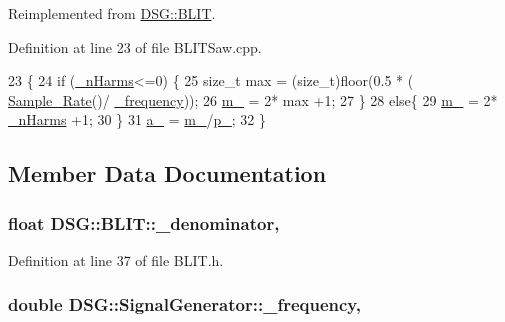 Reimplemented from \hyperlink{classDSG_1_1BLIT_ac59980dee201683229d5a106f941298b}{D\+S\+G\+::\+B\+L\+I\+T}.



Definition at line 23 of file B\+L\+I\+T\+Saw.\+cpp.


\begin{DoxyCode}
23                             \{
24     \textcolor{keywordflow}{if} (\hyperlink{classDSG_1_1BLIT_afe749d26f1503740bedd54f5147bc66d}{\_nHarms}<=0) \{
25         \textcolor{keywordtype}{size\_t} max = (size\_t)floor(0.5 * ( \hyperlink{namespaceDSG_a0c5c3a251b3688398da18138c5efe4bf}{Sample\_Rate}()/ \hyperlink{classDSG_1_1SignalGenerator_a67e296e3506dcdf09402c667cddff9ac}{\_frequency}));
26         \hyperlink{classDSG_1_1BLIT_a93504a847d83314bbd9020750820242b}{m\_} = 2* max +1;
27     \}
28     \textcolor{keywordflow}{else}\{
29         \hyperlink{classDSG_1_1BLIT_a93504a847d83314bbd9020750820242b}{m\_} = 2* \hyperlink{classDSG_1_1BLIT_afe749d26f1503740bedd54f5147bc66d}{\_nHarms} +1;
30     \}
31     \hyperlink{classDSG_1_1BLITSaw_a71b040fae6e1d67b56c580db9f4e5c3a}{a\_} = \hyperlink{classDSG_1_1BLIT_a93504a847d83314bbd9020750820242b}{m\_}/\hyperlink{classDSG_1_1BLITSaw_addcb3fc898bb08c71cfe81e12e2891b9}{p\_};
32 \}\end{DoxyCode}


\subsection{Member Data Documentation}
\hypertarget{classDSG_1_1BLIT_a664b4f06a7b5657261cfaa30dd503c16}{
\subsubsection[{\+\_\+denominator}]{\setlength{\rightskip}{0pt plus 5cm}float D\+S\+G\+::\+B\+L\+I\+T\+::\+\_\+denominator\hspace{0.3cm}{\ttfamily [protected]}, {\ttfamily [inherited]}}}\label{classDSG_1_1BLIT_a664b4f06a7b5657261cfaa30dd503c16}


Definition at line 37 of file B\+L\+I\+T.\+h.

\hypertarget{classDSG_1_1SignalGenerator_a67e296e3506dcdf09402c667cddff9ac}{
\subsubsection[{\+\_\+frequency}]{\setlength{\rightskip}{0pt plus 5cm}double D\+S\+G\+::\+Signal\+Generator\+::\+\_\+frequency\hspace{0.3cm}{\ttfamily [protected]}, {\ttfamily [inherited]}}}\label{classDSG_1_1SignalGenerator_a67e296e3506dcdf09402c667cddff9ac}


